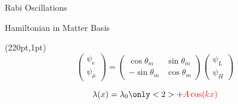 \documentclass[9pt]{beamer}
\begin{document}
\begin{darkframes}
\begin{frame}{Rabi Oscillations}
{}





\end{frame}



\begin{frame}{Hamiltonian in Matter Basis}

\begin{textblock*}{10pt}(220pt,1pt)
\small
\begin{equation*}
\begin{pmatrix}
\psi_e\\
\psi_\mu
\end{pmatrix} = \begin{pmatrix}
\cos \theta_m & \sin\theta_m \\
-\sin \theta_m & \cos \theta_m
\end{pmatrix}\begin{pmatrix}
\psi_L\\
\psi_H
\end{pmatrix}
\end{equation*}

\end{textblock*}


\begin{tcolorbox}[title=Matter Potential]
\begin{equation*}
    \lambda(x)  = \lambda_0 \only<2>{ + {\color{red}A\cos(k x)} }
\end{equation*}
\end{tcolorbox}



\end{frame}
\end{darkframes}
\end{document}
